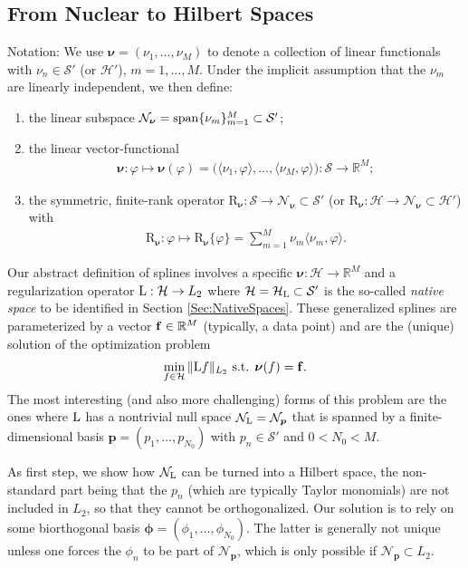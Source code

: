 \documentclass[11pt, english,english]{article}
\newcommand{\R}{ \mathbb{R}}
\newcommand{\Lop}{{\rm L}}
\def\V#1{{\boldsymbol{#1}}}         %
\def\Spc#1{{\mathcal{#1}}}  %
\def\M#1{{\bf{#1}}}  %
\def\Op#1{{\mathrm{#1}}}  %
\renewcommand{\[}{\begin{equation}}
\renewcommand{\]}[1]{\label{eq:#1}\end{equation}}
\newcommand{\Tr}{\mathsf{T}}
\begin{document}
\subsection{From Nuclear to Hilbert Spaces}
\label{Sec:NtoHilbert}
Notation: We use $\V \nu=(\nu_1,\dots,\nu_{M})$ to denote a collection of linear functionals with $\nu_n \in \Spc S'$ (or $\Spc H'$), $m=1, \dots, M$.
Under the implicit assumption that the $\nu_m$ are linearly independent, we then define: 
\begin{enumerate}
\item the linear subspace
$\Spc N_{\V \nu}={\rm span}\{\nu_m\}_{m=1}^{M} \subset \Spc S'$;
\item the linear vector-functional
\begin{align}
\V \nu: \varphi \mapsto \V \nu(\varphi)=\big (\langle \nu_1, \varphi\rangle,\dots, \langle \nu_{M}, \varphi\rangle\big):  \Spc S \to \R^{M};
\end{align}
\item the symmetric, finite-rank operator $\Op R_{\V \nu}: \Spc S \to \Spc N_{\V \nu}\subset \Spc S'$ (or  $\Op R_{\V \nu}: \Spc H \to \Spc N_{\V \nu}\subset \Spc H'$) with
\begin{align}
\Op R_\V \nu: \varphi \mapsto \Op R_\V \nu\{\varphi\}=\sum_{m=1}^M\nu_m \langle \nu_m, \varphi\rangle.%
\end{align}
\end{enumerate}
Our abstract definition of splines involves a specific $\V \nu: \Spc H \to \R^M$
and a regularization operator $\Lop: \Spc H \to L_2$ where $\Spc H=\Spc H_\Lop \subset \Spc S'$ is the so-called {\em native space} to be identified in Section \ref{Sec:NativeSpaces}. These generalized splines are parameterized by a vector $\M f\in \R^M$ (typically, a data point) and are the (unique) solution of the optimization problem
\begin{align}
\label{Eq:GsplineInt}
\min_{f \in \Spc H} \|\Lop f\|_{L_2} \mbox{ s.t. } \V \nu(f)=\M f.
\end{align}
The most interesting (and also more challenging) forms of this problem are the ones where $\Lop$ has a nontrivial null space
$\Spc N_{\Lop}=\Spc N_{\V p}$ that is spanned by a finite-dimensional basis $\V p=(p_1,\dots,p_{N_0})$ with
$p_n \in \Spc S'$ and $0 < N_0 <M$. 

As first step, we show how $\Spc N_{\Lop}$ can be turned into a Hilbert space, the non-standard part being that the
$p_n$ (which are typically Taylor monomials) are not included in $L_2$, so that they cannot be orthogonalized. Our solution is to 
rely on some biorthogonal basis $\V \phi=(\phi_1,\dots,\phi_{N_0})$.
The latter is generally not unique unless
one forces the $\phi_n$ to be part of $\Spc N_{\V p}$, which is only possible if $\Spc N_{\V p}\subset L_2$.
\end{document}
